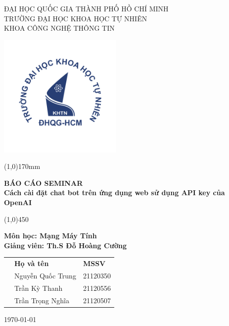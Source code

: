\documentclass[a4paper, 12pt]{article}
\begin{document}
	\begin{titlepage}
		\centering
		
		\textsc{\Large ĐẠI HỌC QUỐC GIA THÀNH PHỐ HỒ CHÍ MINH}\\
		\vspace{0,2cm}
		\textsc{\Large TRƯỜNG  ĐẠI HỌC KHOA HỌC TỰ NHIÊN}\\
		\vspace{0,2cm}
		\textsc{\large KHOA CÔNG NGHỆ THÔNG TIN}
			
		\begin{centering}
			{\includegraphics[width=6cm]{logo.png}}
		\end{centering}
		
		\begin{center}
			\line(1,0){170mm}
		\end{center}
		\Huge \textbf{BÁO CÁO SEMINAR}\\ 
		\vspace{0.1cm}
		\vspace{0.1cm}
		\Huge \textbf{Cách cài đặt chat bot trên ứng dụng web sử dụng API key của OpenAI} \\
		\begin{center}
			\line(1,0){450}
		\end{center}
		
		\vspace{0,2cm}
		\huge \textbf{Môn học: Mạng Máy Tính}\\
		\Large{\textbf{Giảng viên: Th.S Đỗ Hoàng Cường}}
		\Large
		\vspace{1cm}
		\begin{table}[h]
			\centering
			\begin{tabular}{@{}lll@{}}
				& \textbf{Họ và tên}         & \textbf{MSSV} \\
				& Nguyễn Quốc Trung & 21120350 \\
				& Trần Kỳ Thanh     & 21120556 \\
				& Trần Trọng Nghĩa  & 21120507 \\ 
			\end{tabular}
		\end{table}

		
		\vspace{1cm}
		{\scshape \today}
	\end{titlepage}
\end{document}
